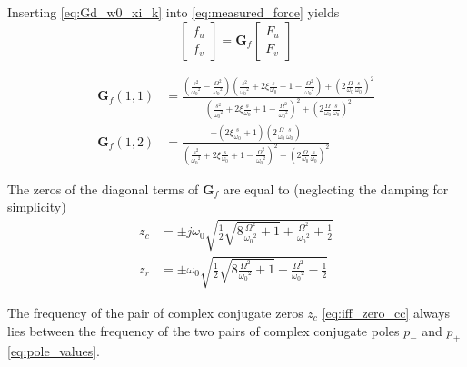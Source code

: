 \documentclass[10pt]{iopart}
\begin{document}
Inserting \eqref{eq:Gd_w0_xi_k} into \eqref{eq:measured_force} yields
\begin{equation}
\label{eq:Gf_mimo_tf}
  \begin{bmatrix} f_{u} \\ f_{v} \end{bmatrix} = \bm{G}_{f} \begin{bmatrix} F_u \\ F_v \end{bmatrix}
\end{equation}

\begin{subequations}
\label{eq:Gf}
  \begin{align}
    \bm{G}_{f}(1,1) &= {\scriptstyle \frac{\left( \frac{s^2}{{\omega_0}^2} - \frac{\Omega^2}{{\omega_0}^2} \right) \left( \frac{s^2}{{\omega_0}^2} + 2 \xi \frac{s}{\omega_0} + 1 - \frac{{\Omega}^2}{{\omega_0}^2} \right) + \left( 2 \frac{\Omega}{\omega_0} \frac{s}{\omega_0} \right)^2}{\left( \frac{s^2}{{\omega_0}^2} + 2 \xi \frac{s}{\omega_0} + 1 - \frac{{\Omega}^2}{{\omega_0}^2} \right)^2 + \left( 2 \frac{\Omega}{\omega_0} \frac{s}{\omega_0} \right)^2} } \\
    \bm{G}_{f}(1,2) &= {\scriptstyle \frac{- \left( 2 \xi \frac{s}{\omega_0} + 1 \right) \left( 2 \frac{\Omega}{\omega_0} \frac{s}{\omega_0} \right)}{\left( \frac{s^2}{{\omega_0}^2} + 2 \xi \frac{s}{\omega_0} + 1 - \frac{{\Omega}^2}{{\omega_0}^2} \right)^2 + \left( 2 \frac{\Omega}{\omega_0} \frac{s}{\omega_0} \right)^2} }
  \end{align}
\end{subequations}

The zeros of the diagonal terms of \(\bm{G}_f\) are equal to (neglecting the damping for simplicity)
\begin{subequations}
  \begin{align}
    z_c &= \pm j \omega_0 \sqrt{\frac{1}{2} \sqrt{8 \frac{\Omega^2}{{\omega_0}^2} + 1} + \frac{\Omega^2}{{\omega_0}^2} + \frac{1}{2} } \label{eq:iff_zero_cc} \\
    z_r &= \pm   \omega_0 \sqrt{\frac{1}{2} \sqrt{8 \frac{\Omega^2}{{\omega_0}^2} + 1} - \frac{\Omega^2}{{\omega_0}^2} - \frac{1}{2} } \label{eq:iff_zero_real}
  \end{align}
\end{subequations}

The frequency of the pair of complex conjugate zeros \(z_c\) \eqref{eq:iff_zero_cc} always lies between the frequency of the two pairs of complex conjugate poles \(p_{-}\) and \(p_{+}\) \eqref{eq:pole_values}.
\end{document}
